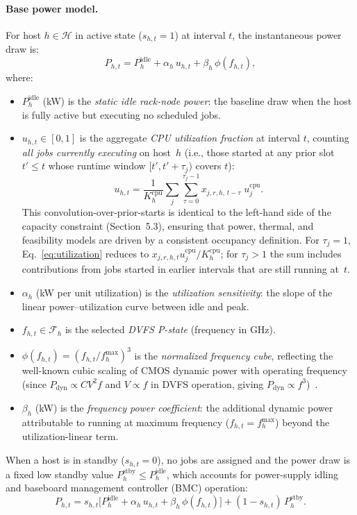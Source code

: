 \documentclass[a4paper,fleqn]{cas-dc}
\begin{document}
\paragraph{Base power model.}
For host $h \in \mathcal{H}$ in active state ($s_{h,t}=1$) at interval $t$, the instantaneous power draw is:
\begin{equation}
\label{eq:power}
P_{h,t} = P^{\mathrm{idle}}_{h} + \alpha_h \, u_{h,t} + \beta_h \, \phi(f_{h,t}),
\end{equation}
where:
\begin{itemize}
  \item $P^{\mathrm{idle}}_{h}$ (kW) is the \emph{static idle rack-node power}: the baseline draw when the host is fully active but executing no scheduled jobs.
  \item $u_{h,t} \in [0,1]$ is the aggregate \emph{CPU utilization fraction} at interval $t$, counting \emph{all jobs currently executing} on host~$h$ (i.e., those started at any prior slot $t' \leq t$ whose runtime window $[t', t' + \tau_j)$ covers $t$):
  \begin{equation}
  \label{eq:utilization}
  u_{h,t} = \frac{1}{K^{\mathrm{cpu}}_h} \sum_{j} \sum_{\tau=0}^{\tau_j - 1} x_{j,r,h,\,t-\tau} \; u^{\mathrm{cpu}}_j.
  \end{equation}
  This convolution-over-prior-starts is identical to the left-hand side of the capacity constraint (Section~5.3), ensuring that power, thermal, and feasibility models are driven by a consistent occupancy definition.  For $\tau_j = 1$, Eq.~\eqref{eq:utilization} reduces to $x_{j,r,h,t} u^{\mathrm{cpu}}_j / K^{\mathrm{cpu}}_h$; for $\tau_j > 1$ the sum includes contributions from jobs started in earlier intervals that are still running at~$t$.
  \item $\alpha_h$ (kW per unit utilization) is the \emph{utilization sensitivity}: the slope of the linear power--utilization curve between idle and peak.
  \item $f_{h,t} \in \mathcal{F}_h$ is the selected \emph{DVFS P-state} (frequency in GHz).
  \item $\phi(f_{h,t}) = (f_{h,t}/f^{\max}_h)^3$ is the \emph{normalized frequency cube}, reflecting the well-known cubic scaling of CMOS dynamic power with operating frequency (since $P_{\mathrm{dyn}} \propto C V^2 f$ and $V \propto f$ in DVFS operation, giving $P_{\mathrm{dyn}} \propto f^3$)~\cite{ref-li18}.
  \item $\beta_h$ (kW) is the \emph{frequency power coefficient}: the additional dynamic power attributable to running at maximum frequency ($f_{h,t} = f^{\max}_h$) beyond the utilization-linear term.
\end{itemize}
When a host is in standby ($s_{h,t}=0$), no jobs are assigned and the power draw is a fixed low standby value $P^{\mathrm{stby}}_h \leq P^{\mathrm{idle}}_h$, which accounts for power-supply idling and baseboard management controller (BMC) operation:
\begin{equation}
\label{eq:power_state}
P_{h,t} = s_{h,t} \bigl[ P^{\mathrm{idle}}_{h} + \alpha_h \, u_{h,t} + \beta_h \, \phi(f_{h,t}) \bigr]
         + (1 - s_{h,t}) \, P^{\mathrm{stby}}_h.
\end{equation}
\end{document}
